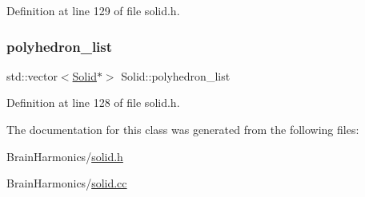 Definition at line 129 of file solid.\+h.

\mbox{\label{class_solid_a67ef5cdd87e5629159660fa9bb5833c8}} 
\subsubsection{\texorpdfstring{polyhedron\+\_\+list}{polyhedron\_list}}
{\footnotesize\ttfamily std\+::vector$<$\mbox{\hyperlink{class_solid}{Solid}}$\ast$$>$ Solid\+::polyhedron\+\_\+list\hspace{0.3cm}{\ttfamily [protected]}}



Definition at line 128 of file solid.\+h.



The documentation for this class was generated from the following files\+:\begin{DoxyCompactItemize}
\item 
Brain\+Harmonics/\mbox{\hyperlink{solid_8h}{solid.\+h}}\item 
Brain\+Harmonics/\mbox{\hyperlink{solid_8cc}{solid.\+cc}}\end{DoxyCompactItemize}
